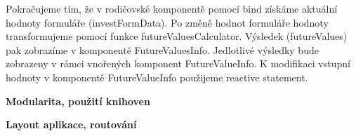Pokračujeme tím, že v rodičovské komponentě pomocí bind získáme aktuální hodnoty formuláře (investFormData). Po změně hodnot formuláře hodnoty transformujeme pomocí funkce futureValuesCalculator. 
Výsledek (futureValues) pak zobrazíme v komponentě FutureValuesInfo. Jedlotlivé výsledky bude zobrazeny v rámci vnořených komponent FutureValueInfo. 
K modifikaci vstupní hodnoty v komponentě FutureValueInfo použijeme reactive statement.

\begin{flushleft}
  \textbf{Modularita, použití knihoven}
\end{flushleft}

\begin{flushleft}
  \textbf{Layout aplikace, routování}
\end{flushleft}